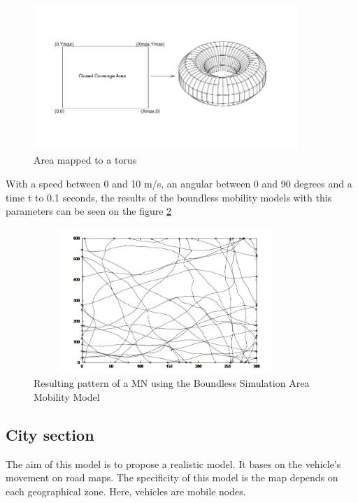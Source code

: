 \begin{figure}[h]
\center
\includegraphics[width=10cm,height=55mm]{../images/boundlessmobilitymodel1.png}
\caption{\label{BoundlessFig}Area mapped to a torus}
\end{figure}


With a speed between 0 and 10 m/s, an angular between 0 and 90 degrees and a time t to 0.1 seconds, the results of the boundless mobility models with this parameters can be seen on the figure \ref{BoundlessFig2}\\

\begin{figure}[h]
\center
\includegraphics[width=10cm,height=55mm]{../images/boundlessmobilitymodel2.png}
\caption{\label{BoundlessFig2}Resulting pattern of a MN using the Boundless Simulation Area Mobility Model}
\end{figure}

\newpage
\subsection{City section}

The aim of this model is to propose a realistic model. It bases on the vehicle's movement on road maps. The specificity of this model is the map depends on each geographical zone. Here, vehicles are mobile nodes.\\\\

